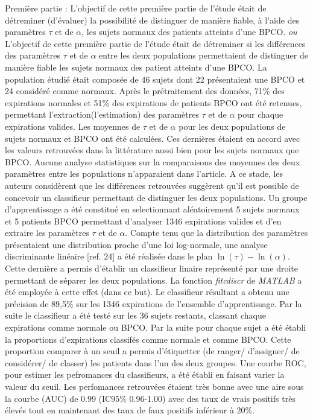 \documentclass[12pt,]{article}
\begin{document}
Première partie : L'objectif de cette première partie de l'étude était
de détreminer (d'évaluer) la possibilité de distinguer de manière
fiable, à l'aide des paramètres \(\tau\) et de \(\alpha\), les sujets
normaux des patients atteints d'une BPCO. \emph{ou} L'objectif de cette
première partie de l'étude était de détreminer si les différences des
paramètres \(\tau\) et de \(\alpha\) entre les deux populations
permettaient de distinguer de manière fiable les sujets normaux des
patient atteints d'une BPCO. La population étudié était composée de 46
sujets dont 22 présentaient une BPCO et 24 considéré comme normaux.
Après le prétraitement des données, 71\% des expirations normales et
51\% des expirations de patients BPCO ont été retenues, permettant
l'extraction(l'estimation) des paramètres \(\tau\) et de \(\alpha\) pour
chaque expirations valides. Les moyennes de \(\tau\) et de \(\alpha\)
pour les deux populations de sujets normaux et BPCO ont été calculées.
Ces dernières étaient en accord avec les valeurs retrouvées dans la
littérature aussi bien pour les sujets normaux que BPCO. Aucune analyse
statistiques sur la comparaisons des moyennes des deux paramètres entre
les populations n'apparaient dans l'article. A ce stade, les auteurs
considèrent que les différences retrouvées suggèrent qu'il est possible
de concevoir un classifieur permettant de distinguer les deux
populations. Un groupe d'apprentissage a été constitué en selectionnant
aléatoirement 5 sujets normaux et 5 patients BPCO permettant d'analyser
1346 expirations valides et d'en extraire les paramètres \(\tau\) et de
\(\alpha\). Compte tenu que la distribution des paramètres présentaient
une distribution proche d'une loi log-normale, une analyse discriminante
linéaire {[}ref. 24{]} a été réalisée dans le plan
\(\ln(\tau)-\ln(\alpha)\). Cette dernière a permis d'établir un
classifieur linaire représenté par une droite permettant de séparer les
deux populations. La fonction \emph{fitcdiscr} de \emph{MATLAB} a été
employée à cette effet (dans ce but). Le classifieur résultant a obtenu
une précision de 89,5\% sur les 1346 expirations de l'ensemble
d'apprentissage. Par la suite le classifieur a été testé sur les 36
sujets restants, classant chaque expirations comme normale ou BPCO. Par
la suite pour chaque sujet a été établi la proportions d'expirations
classifés comme normale et comme BPCO. Cette proportion comparer à un
seuil a permis d'étiquetter (de ranger/ d'assigner/ de considérer/ de
classer) les patients dans l'un des deux groupes. Une courbe ROC, pour
estimer les pefromances du classifieurs, a été établi en faisant varier
la valeur du seuil. Les perfomances retrouvées étaient très bonne avec
une aire sous la courbe (AUC) de 0.99 (IC95\% 0.96-1.00) avec des taux
de vrais positifs très élevés tout en maintenant des taux de faux
positifs inférieur à 20\%.
\end{document}
